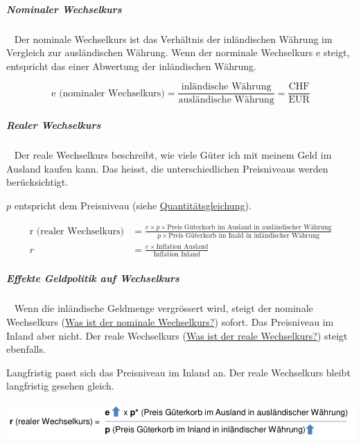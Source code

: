 \documentclass[11pt,twoside,landscape]{article}
\begin{document}
\begin{multicols}{3}
\subparagraph{Nominaler Wechselkurs} \
\label{sec:orgfb9bbd5}
Der nominale Wechselkurs ist das Verhältnis der inländischen Währung im Vergleich zur ausländischen Währung.
Wenn der norminale Wechselkurs e steigt, entspricht das einer Abwertung der inländischen Währung.

\begin{equation}
  \label{eqn:nominaler-wechselkurs}
  \text{e (nominaler Wechselkurs)} = \frac{\text{inländische Währung}}{\text{ausländische Währung}} = \frac{\text{CHF}}{\text{EUR}}
\end{equation}

\subparagraph{Realer Wechselkurs} \
\label{sec:org01b1641}
Der reale Wechselkurs beschreibt, wie viele Güter ich mit meinem Geld im Ausland kaufen kann.
Das heisst, die unterschiedlichen Preisniveaus werden berücksichtigt.

\(p\) entspricht dem Preisniveau (siehe \href{../../../roam/20220614170056-wie_sieht_der_theoretische_zusammenhang_zwischen_der_geldpolitik_der_zentralbank_und_der_inflation_aus.org}{Quantitätsgleichung}).

\begin{equation}
  \label{eqn:realer-wechselkurs}
  \begin{align}
  \text{r (realer Wechselkurs)} &= \frac{e \times p \times \text{Preis Güterkorb im Ausland in ausländischer Währung}}{p \times \text{Preis Güterkorb im Inald in inländischer Währung}} \\
    r &= \frac{e \times \text{Inflation Ausland}}{\text{Inflation Inland}}
  \end{align}

\end{equation}

\subparagraph{Effekte Geldpolitik auf Wechselkurs} \
\label{sec:org1a64d4b}
Wenn die inländische Geldmenge vergrössert wird, steigt der nominale Wechselkurs (\href{../../../roam/20220615143018-was_ist_der_nominale_wechselkurs.org}{Was ist der nominale Wechselkurs?}) sofort.
Das Preisniveau im Inland aber nicht.
Der reale Wechselkurs (\href{../../../roam/20220615150048-was_ist_der_reale_wechselkurs.org}{Was ist der reale Wechselkurs?}) steigt ebenfalls.

Langfristig passt sich das Preisniveau im Inland an.
Der reale Wechselkurs bleibt langfristig gesehen gleich.


{
\begin{center}
\includegraphics[width=.9\linewidth]{img/langfritiger_effekt_realer_wechselkurs.png}
\end{center}
\label{fig:langfristige-effekte}
}


\end{multicols}
\end{document}
